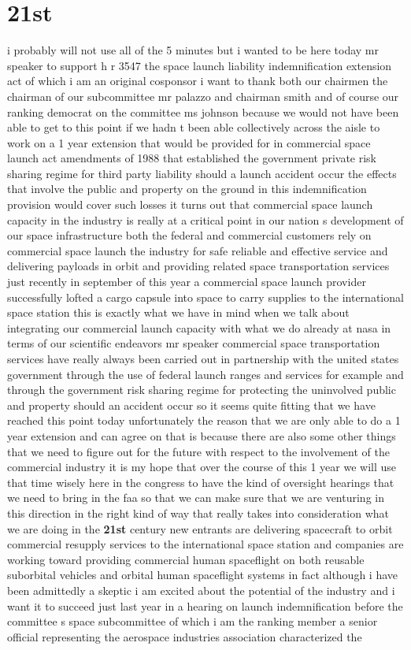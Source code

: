 \documentclass{article}
\begin{document}
\section*{21st}
i probably will not use all of the 5 minutes but i wanted to be here today mr speaker to support h r 3547 the space launch liability indemnification extension act of which i am an original cosponsor i want to thank both our chairmen the chairman of our subcommittee mr palazzo and chairman smith and of course our ranking democrat on the committee ms johnson because we would not have been able to get to this point if we hadn t been able collectively across the aisle to work on a 1 year extension that would be provided for in commercial space launch act amendments of 1988 that established the government private risk sharing regime for third party liability should a launch accident occur the effects that involve the public and property on the ground in this indemnification provision would cover such losses it turns out that commercial space launch capacity in the industry is really at a critical point in our nation s development of our space infrastructure both the federal and commercial customers rely on commercial space launch the industry for safe reliable and effective service and delivering payloads in orbit and providing related space transportation services just recently in september of this year a commercial space launch provider successfully lofted a cargo capsule into space to carry supplies to the international space station this is exactly what we have in mind when we talk about integrating our commercial launch capacity with what we do already at nasa in terms of our scientific endeavors mr speaker commercial space transportation services have really always been carried out in partnership with the united states government through the use of federal launch ranges and services for example and through the government risk sharing regime for protecting the uninvolved public and property should an accident occur so it seems quite fitting that we have reached this point today unfortunately the reason that we are only able to do a 1 year extension and can agree on that is because there are also some other things that we need to figure out for the future with respect to the involvement of the commercial industry it is my hope that over the course of this 1 year we will use that time wisely here in the congress to have the kind of oversight hearings that we need to bring in the faa so that we can make sure that we are venturing in this direction in the right kind of way that really takes into consideration what we are doing in the {\bf \color{red} 21st} century new entrants are delivering spacecraft to orbit commercial resupply services to the international space station and companies are working toward providing commercial human spaceflight on both reusable suborbital vehicles and orbital human spaceflight systems in fact although i have been admittedly a skeptic i am excited about the potential of the industry and i want it to succeed just last year in a hearing on launch indemnification before the committee s space subcommittee of which i am the ranking member a senior official representing the aerospace industries association characterized the 
\end{document}
